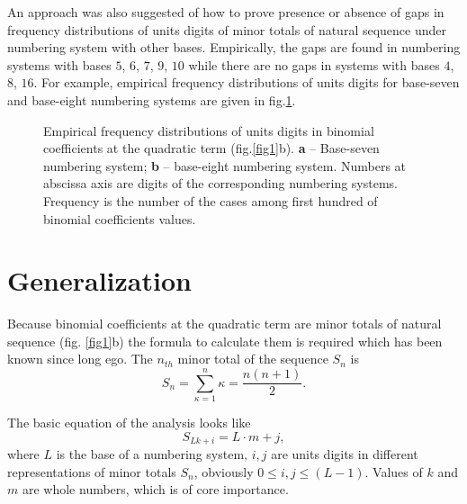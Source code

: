 \documentclass[12pt, twoside, leqno]{article}
\theoremstyle{definition}
\numberwithin{equation}{section}
\begin{document}
An approach was also suggested of how to prove presence or absence of gaps in frequency distributions of units digits of minor totals of natural sequence under numbering system with other bases. Empirically, the gaps are found in numbering systems with bases $5$, $6$, $7$, $9$, $10$ while there are no gaps in systems with bases $4$, $8$, $16$. For example, empirical frequency distributions of units digits for base-seven and base-eight numbering systems are given in fig.\ref{fig2}.

\begin{figure}[tb]
\begin{minipage}[h]{0.49\textwidth}
\end{minipage}
\hfill
\begin{minipage}[h]{0.49\textwidth}
\end{minipage}
\caption{Empirical frequency distributions of units digits in binomial coefficients at the quadratic term (fig.\ref{fig1}b). \textbf{a} -- Base-seven numbering system; \textbf{b} -- base-eight numbering system. Numbers at abscissa axis are digits of the corresponding numbering systems. Frequency is the number of the cases among first hundred of binomial coefficients values.}
\label{fig2}
\end{figure}

\section{Generalization}

Because binomial coefficients at the quadratic term are minor totals of natural sequence (fig. \ref{fig1}b) the formula to calculate them is required which has been known since long ego. The $n_{th}$ minor total of the sequence $S_n$ is
\begin{equation}
S_n = \sum^n_{\kappa =1}\kappa = \frac{n(n+1)}{2}.
\label{eq:2}
\end{equation}

The basic equation of the analysis looks like
\begin{equation}
S_{Lk+i} = L\cdot m + j,
\label{eq:3}
\end{equation}
where $L$ is the base of a numbering system, $i, j$ are units digits in different representations of minor totals $S_n$, obviously $0 \leq  i, j \leq (L-1)$. Values of $k$ and $m$ are whole numbers, which is of core importance.
\end{document}
